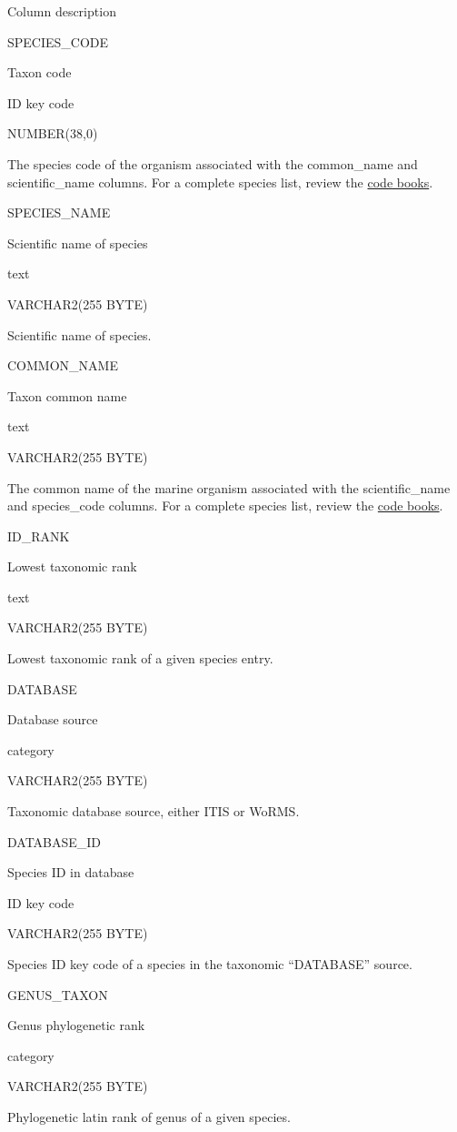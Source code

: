 \documentclass[
  letterpaper,
  oneside,
  open=any]{scrbook}
\begin{document}
Column description

SPECIES\_CODE

Taxon code

ID key code

NUMBER(38,0)

The species code of the organism associated with the common\_name and
scientific\_name columns. For a complete species list, review the
\href{https://www.fisheries.noaa.gov/resource/document/groundfish-survey-species-code-manual-and-data-codes-manual}{code
books}.

SPECIES\_NAME

Scientific name of species

text

VARCHAR2(255 BYTE)

Scientific name of species.

COMMON\_NAME

Taxon common name

text

VARCHAR2(255 BYTE)

The common name of the marine organism associated with the
scientific\_name and species\_code columns. For a complete species list,
review the
\href{https://www.fisheries.noaa.gov/resource/document/groundfish-survey-species-code-manual-and-data-codes-manual}{code
books}.

ID\_RANK

Lowest taxonomic rank

text

VARCHAR2(255 BYTE)

Lowest taxonomic rank of a given species entry.

DATABASE

Database source

category

VARCHAR2(255 BYTE)

Taxonomic database source, either ITIS or WoRMS.

DATABASE\_ID

Species ID in database

ID key code

VARCHAR2(255 BYTE)

Species ID key code of a species in the taxonomic ``DATABASE'' source.

GENUS\_TAXON

Genus phylogenetic rank

category

VARCHAR2(255 BYTE)

Phylogenetic latin rank of genus of a given species.
\end{document}
